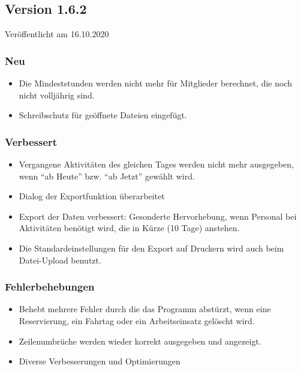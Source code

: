 \begin{neu}
\subsection{Version 1.6.2}
\label{version:1:6:2}
Veröffentlicht am 16.10.2020
\subsubsection{Neu}
\begin{itemize}
  \item Die Mindeststunden werden nicht mehr für Mitglieder berechnet, die noch nicht volljährig sind.
  \item Schreibschutz für geöffnete Dateien eingefügt.
\end{itemize}

\subsubsection{Verbessert}
\begin{itemize}
  \item Vergangene Aktivitäten des gleichen Tages werden nicht mehr ausgegeben, wenn "`ab Heute"' bzw. "`ab Jetzt"' gewählt wird.
  \item Dialog der Exportfunktion überarbeitet
  \item Export der Daten verbessert: Gesonderte Hervorhebung, wenn Personal bei Aktivitäten benötigt wird, die in Kürze (10 Tage) anstehen.
  \item Die Standardeinstellungen für den Export auf Druckern wird auch beim Datei-Upload benutzt.
\end{itemize}

\subsubsection{Fehlerbehebungen}
\begin{itemize}
  \item Behebt mehrere Fehler durch die das Programm abstürzt, wenn eine Reservierung, ein Fahrtag oder ein Arbeitseinsatz gelöscht wird.
  \item Zeilenumbrüche werden wieder korrekt ausgegeben und angezeigt.
  \item Diverse Verbesserungen und Optimierungen
\end{itemize}
\end{neu}
